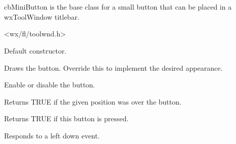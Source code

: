 %
%


\section{}\label{cbminibutton}


cbMiniButton is the base class for a small button that can be placed in a wxToolWindow
titlebar.




<wx/fl/toolwnd.h>




\label{cbminibuttoncbminibutton}


Default constructor.


\label{cbminibuttondraw}


Draws the button. Override this to implement
the desired appearance.


\label{cbminibuttonenable}


Enable or disable the button.


\label{cbminibuttonhittest}


Returns TRUE if the given position was over the button.


\label{cbminibuttonispressed}


Returns TRUE if this button is pressed.


\label{cbminibuttononleftdown}


Responds to a left down event.


\label{cbminibuttononleftup}

